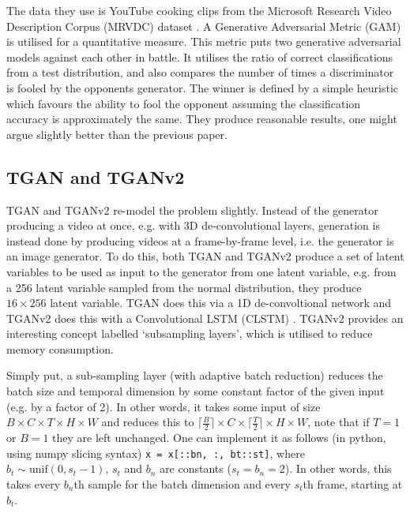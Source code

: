 \documentclass{report}
\theoremstyle{plain}
\theoremstyle{definition}
\theoremstyle{remark}
\numberwithin{equation}{section}
\numberwithin{figure}{section}
\newcommand{\<}{\langle}
\renewcommand{\>}{\rangle}
\begin{document}
The data they use is YouTube cooking clips from the Microsoft Research Video Description Corpus (MRVDC) dataset \cite{noauthor_microsoft_nodate}. A Generative Adversarial Metric (GAM) is utilised for a quantitative measure. This metric puts two generative adversarial models against each other in battle. It utilises the ratio of correct classifications from a test distribution, and also compares the number of times a discriminator is fooled by the opponents generator. The winner is defined by a simple heuristic which favours the ability to fool the opponent assuming the classification accuracy is approximately the same. They produce reasonable results, one might argue slightly better than the previous paper.

\subsection{TGAN and TGANv2}

TGAN \cite{saito_temporal_2016} and TGANv2 \cite{saito_tganv2:_2018} re-model the problem slightly. Instead of the generator producing a video at once, e.g. with 3D de-convolutional layers, generation is instead done by producing videos at a frame-by-frame level, i.e. the generator is an image generator. To do this, both TGAN and TGANv2 produce a set of latent variables to be used as input to the generator from one latent variable, e.g. from a 256 latent variable sampled from the normal distribution, they produce $16\times256$ latent variable. TGAN does this via a 1D de-convoltional network and TGANv2 does this with a Convolutional LSTM (CLSTM) \cite{shi_convolutional_2015}. TGANv2 provides an interesting concept labelled `subsampling layers', which is utilised to reduce memory consumption.

Simply put, a sub-sampling layer (with adaptive batch reduction) reduces the batch size and temporal dimension by some constant factor of the given input (e.g. by a factor of 2). In other words, it takes some input of size $B \times C \times T \times H \times W$ and reduces this to $\lceil \frac{B}{2} \rceil \times C \times \lceil \frac{T}{2} \rceil \times H \times W$, note that if $T=1$ or $B=1$ they are left unchanged. One can implement it as follows (in python, using numpy slicing syntax) \texttt{x = x[::bn, :, bt::st]}, where $b_t \sim \text{unif}(0, s_t - 1)$, $s_t$ and $b_n$ are constants ($s_t = b_n = 2$). In other words, this takes every $b_n$th sample for the batch dimension and every $s_t$th frame, starting at $b_t$.
\end{document}
